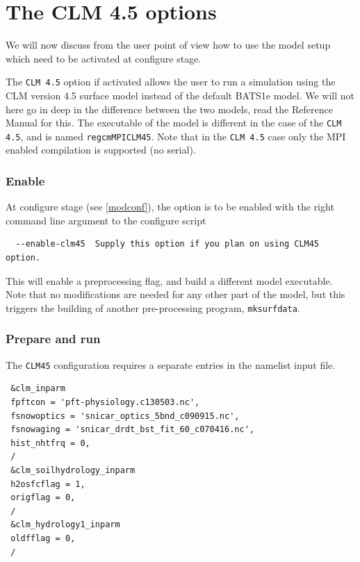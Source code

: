 \section{The CLM 4.5 options}
\label{clm45}

We will now discuss from the user point of view how to use the model
setup which need to be activated at configure stage.

The \verb=CLM 4.5= option if activated allows the user to run a simulation using
the CLM version 4.5 surface model instead of the default BATS1e model.
We will not here go in deep in the difference between the two models, read
the Reference Manual for this.
The executable of the model is different in the case of the \verb=CLM 4.5=,
and is named \verb=regcmMPICLM45=.
Note that in the \verb=CLM 4.5= case only the MPI enabled compilation is
supported (no serial).

\subsubsection{Enable}

At configure stage (see \ref{modconf}), the option is to be enabled with the
right command line argument to the configure script

\begin{Verbatim}
  --enable-clm45  Supply this option if you plan on using CLM45 option.
\end{Verbatim}

This will enable a preprocessing flag, and build a different model executable.
Note that no modifications are needed for any other part of the model, but
this triggers the building of another pre-processing program, \verb=mksurfdata=.

\subsubsection{Prepare and run}
\label{clm45run}

The \verb=CLM45= configuration requires a separate entries in the namelist input
file.

{\footnotesize
\begin{Verbatim}
 &clm_inparm
 fpftcon = 'pft-physiology.c130503.nc',
 fsnowoptics = 'snicar_optics_5bnd_c090915.nc',
 fsnowaging = 'snicar_drdt_bst_fit_60_c070416.nc',
 hist_nhtfrq = 0,
 /
 &clm_soilhydrology_inparm
 h2osfcflag = 1,
 origflag = 0,
 /
 &clm_hydrology1_inparm
 oldfflag = 0,
 /
\end{Verbatim}
}

